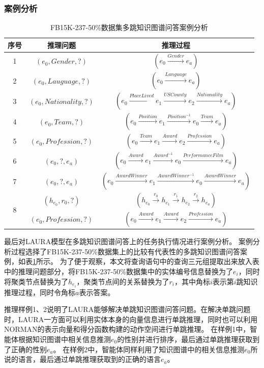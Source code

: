 \documentclass[algorithmlist, AutoFakeBold, AutoFakeSlant, figurelist, tablelist, nomlist, engineering, openany]{seuthesix} %
\begin{document}
\subsubsection{案例分析}
\begin{table}[t]
  \centering
  \caption{FB15K-237-50\%数据集多跳知识图谱问答案例分析}
  \begin{tabular*}{0.95\textwidth}{@{\extracolsep{\fill}}ccc}
    \toprule[1pt] 
    序号 & 推理问题 & 推理过程 \\ \hline
    1 & $(e_0, Gender, ?)$ & $(e_0 \xrightarrow{Gender} e_a)$ \\
    2 & $(e_0, Lauguage, ?)$ & $(e_0 \xrightarrow{Language} e_a)$ \\\hline
    3 & $(e_0, Nationality, ?)$ & $(e_0 \xrightarrow{PlaceLived} e_1 \xrightarrow{USCounty} e_2 \xrightarrow{Nationality} e_a)$ \\
    4 & $(e_0, Team, ?)$ & $(e_0 \xrightarrow{Position} e_1 \xrightarrow{Position^{-1}} e_0 \xrightarrow{Team} e_a)$ \\
    5 & $(e_0, Profession, ?)$ & $(e_0 \xrightarrow{Team} e_1 \xrightarrow{Award} e_2 \xrightarrow{Profession} e_a)$ \\\hline
    6 & $(e_0, ?, e_a)$ & $(e_0 \xrightarrow{Award} e_1 \xrightarrow{Award^{-1}} e_0 \xrightarrow{PerformanceFilm} e_a) $ \\
    7 & $(e_0, ?, e_a)$ & $(e_0 \xrightarrow{AwardWinner} e_1 \xrightarrow{AwardWinner^{-1}} e_0 \xrightarrow{AwardWinner} e_a) $ \\\hline
    \multirow{2}{*}{8} & $(h_{e_0}, r_0, ?)$ & $(h_{e_0} \xrightarrow{r_0} h_{e_1} \xrightarrow{r_1} h_{e_2} \xrightarrow{r_2} h_{e_a})$ \\
    & $(e_0, Profession, ?)$ & $(e_0 \xrightarrow{Award} e_1 \xrightarrow{Award} e_2 \xrightarrow{Profession} e_a)$ \\
    \bottomrule[1pt]
  \end{tabular*}
  \label{Experiment2_CaseStudy}
\end{table}

最后对LAURA模型在多跳知识图谱问答上的任务执行情况进行案例分析。
案例分析过程选择了FB15K-237-50\%数据集上的比较有代表性的多跳知识图谱问答案例，如表\ref{Experiment2_CaseStudy}所示。
为了便于观察，本文将查询语句中的查询三元组提取出来放入表中的推理问题部分，将FB15K-237-50\%数据集中的实体编号信息替换为了$e_i$，同时将聚类节点替换为了$h_{e_i}$，聚类节点间的关系替换为了$r_i$，其中角标$i$表示第$i$跳知识推理过程，同时令角标$a$表示答案。

推理样例1、2说明了LAURA能够解决单跳知识图谱问答问题。在解决单跳问题时，LAURA一方面可以利用实体本身的向量信息进行单跳推理，同时也可以利用NORMAN的表示向量和得分函数构建的动作空间进行单跳推理。
在样例1中，智能体根据知识图谱中相关信息推测$e_0$的性别并进行排序，最后通过单跳推理获取到了正确的性别$e_a$。
在样例2中，智能体同样利用了知识图谱中的相关信息推测$e_0$所说的语言，最后通过单跳推理获取到的正确的语言$e_a$。
\end{document}
